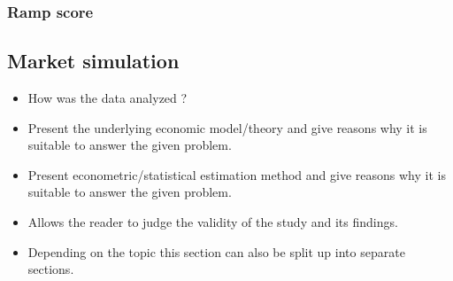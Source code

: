 \subsubsection{Ramp score}




\subsection{Market simulation}\label{Sec:Method;Subsec:Market}




\begin{itemize}

    \item How was the data analyzed ?

    \item Present the underlying economic model/theory and
        give reasons why it is suitable to answer the given problem.

    \item Present econometric/statistical estimation method and
        give reasons why it is suitable to answer the given problem.

    \item Allows the reader to judge the validity of the study and its findings.

    \item Depending on the topic this section can also be split up into separate sections.

\end{itemize}
